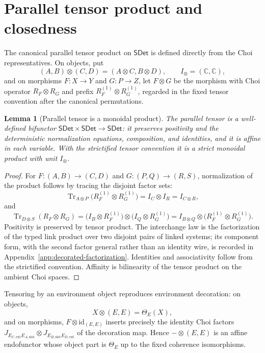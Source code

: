 \documentclass[11pt,a4paper]{article}
\theoremstyle{definition}
\theoremstyle{plain}
\newtheorem{lemma}[theorem]{Lemma}
\theoremstyle{remark}
\DeclareMathOperator{\Tr}{Tr}
\newcommand{\id}{\mathrm{id}}
\newcommand{\SDet}{\mathsf{SDet}}
\begin{document}
\section{Parallel tensor product and closedness}

The canonical parallel tensor product on $\SDet$ is defined directly from
the Choi representatives. On objects, put
\[
(A,B)\otimes(C,D)=(A\otimes C,B\otimes D),
\qquad
I_\otimes=(\mathbb C,\mathbb C),
\]
and on morphisms $F:X\to Y$ and $G:P\to Z$, let $F\otimes G$ be the
morphism with Choi operator $R_F\otimes R_G$ and prefix
$R_F^{(1)}\otimes R_G^{(1)}$, regarded in the fixed tensor convention
after the canonical permutations.

\begin{lemma}[Parallel tensor is a monoidal product]
\label{lem:parallel}
The parallel tensor is a well-defined bifunctor
$\SDet\times\SDet\to\SDet$: it preserves positivity and the
deterministic normalization equations, composition, and identities, and
it is affine in each variable. With the strictified tensor convention it
is a strict monoidal product with unit $I_\otimes$.
\end{lemma}
\begin{proof}
For $F:(A,B)\to(C,D)$ and $G:(P,Q)\to(R,S)$, normalization of the
product follows by tracing the disjoint factor sets:
\[
\Tr_{A\otimes P}\bigl(R_F^{(1)}\otimes R_G^{(1)}\bigr)
=I_C\otimes I_R
=I_{C\otimes R},
\]
and
\[
\Tr_{D\otimes S}(R_F\otimes R_G)
=\bigl(I_B\otimes R_F^{(1)}\bigr)\otimes\bigl(I_Q\otimes R_G^{(1)}\bigr)
=I_{B\otimes Q}\otimes\bigl(R_F^{(1)}\otimes R_G^{(1)}\bigr).
\]
Positivity is preserved by tensor product. The interchange law is the
factorization of the typed link product over two disjoint pairs of
linked systems; its component form, with the second factor general
rather than an identity wire, is recorded in
Appendix~\ref{app:decorated-factorization}. Identities and
associativity follow from the strictified convention. Affinity is
bilinearity of the tensor product on the ambient Choi spaces.
\end{proof}

Tensoring by an environment object reproduces environment decoration:
on objects,
\[
X\otimes(E,E)=\Theta_E(X),
\]
and on morphisms, $F\otimes\id_{(E,E)}$ inserts precisely the identity
Choi factors
$J_{E_{C,\mathrm{ext}}E_{A,\mathrm{slot}}}\otimes
J_{E_{B,\mathrm{slot}}E_{D,\mathrm{ext}}}$
of the decoration map. Hence $-\otimes(E,E)$ is an affine endofunctor
whose object part is $\Theta_E$ up to the fixed coherence isomorphisms.
\end{document}
